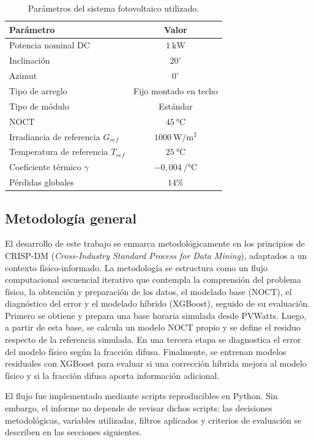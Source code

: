 \documentclass[12pt, letterpaper]{article}
\begin{document}
\begin{table}[H]
\centering
\caption{Par\'ametros del sistema fotovoltaico utilizado.}
\label{tab:parametros_fv}
\begin{tabular}{lc}
\toprule
\textbf{Par\'ametro} & \textbf{Valor} \\
\midrule
Potencia nominal DC & \(\SI{1}{\kilo\watt}\) \\
Inclinaci\'on & \(20^\circ\) \\
Azimut & \(0^\circ\) \\
Tipo de arreglo & Fijo montado en techo \\
Tipo de m\'odulo & Est\'andar \\
NOCT & \(\SI{45}{\celsius}\) \\
Irradiancia de referencia \(G_{ref}\) & \(\SI{1000}{\watt\per\square\meter}\) \\
Temperatura de referencia \(T_{ref}\) & \(\SI{25}{\celsius}\) \\
Coeficiente t\'ermico \(\gamma\) & \(-0{,}004\ \si{\per\celsius}\) \\
P\'erdidas globales & \(14\%\) \\
\bottomrule
\end{tabular}
\end{table}

\subsection{Metodolog\'ia general}

El desarrollo de este trabajo se enmarca metodol\'ogicamente en los principios de CRISP-DM (\textit{Cross-Industry Standard Process for Data Mining}), adaptados a un contexto f\'isico-informado. La metodolog\'ia se estructura como un flujo computacional secuencial iterativo que contempla la comprensi\'on del problema f\'isico, la obtenci\'on y preparaci\'on de los datos, el modelado base (NOCT), el diagn\'ostico del error y el modelado h\'ibrido (XGBoost), seguido de su evaluaci\'on. Primero se obtiene y prepara una base horaria simulada desde PVWatts. Luego, a partir de esta base, se calcula un modelo NOCT propio y se define el residuo respecto de la referencia simulada. En una tercera etapa se diagnostica el error del modelo f\'isico seg\'un la fracci\'on difusa. Finalmente, se entrenan modelos residuales con XGBoost para evaluar si una correcci\'on h\'ibrida mejora al modelo f\'isico y si la fracci\'on difusa aporta informaci\'on adicional.

El flujo fue implementado mediante scripts reproducibles en Python. Sin embargo, el informe no depende de revisar dichos scripts: las decisiones metodol\'ogicas, variables utilizadas, filtros aplicados y criterios de evaluaci\'on se describen en las secciones siguientes.
\end{document}
